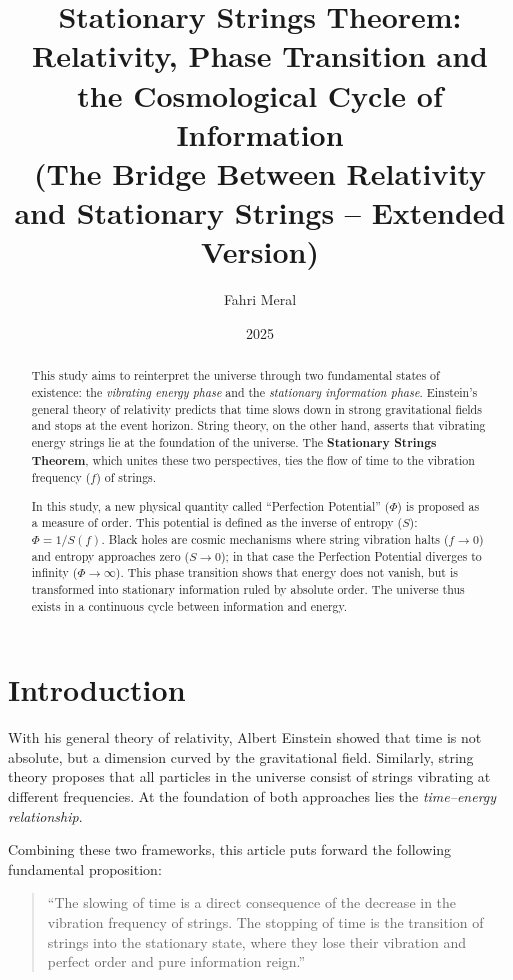 \documentclass[12pt,a4paper]{article}
\title{\textbf{Stationary Strings Theorem: Relativity, Phase Transition and the Cosmological Cycle of Information}\\
\large (The Bridge Between Relativity and Stationary Strings -- Extended Version)}
\author{Fahri Meral}
\date{2025}
\begin{document}
\maketitle

\begin{abstract}
This study aims to reinterpret the universe through two fundamental states of existence: the \textit{vibrating energy phase} and the \textit{stationary information phase}.
Einstein's general theory of relativity predicts that time slows down in strong gravitational fields and stops at the event horizon.
String theory, on the other hand, asserts that vibrating energy strings lie at the foundation of the universe.
The \textbf{Stationary Strings Theorem}, which unites these two perspectives, ties the flow of time to the vibration frequency ($f$) of strings.

In this study, a new physical quantity called ``Perfection Potential'' ($\Phi$) is proposed as a measure of order. This potential is defined as the inverse of entropy ($S$): $\Phi = 1/S(f)$. Black holes are cosmic mechanisms where string vibration halts ($f \to 0$) and entropy approaches zero ($S \to 0$); in that case the Perfection Potential diverges to infinity ($\Phi \to \infty$). This phase transition shows that energy does not vanish, but is transformed into stationary information ruled by absolute order. The universe thus exists in a continuous cycle between information and energy.
\end{abstract}

\section{Introduction}
With his general theory of relativity, Albert Einstein showed that time is not absolute, but a dimension curved by the gravitational field.
Similarly, string theory proposes that all particles in the universe consist of strings vibrating at different frequencies.
At the foundation of both approaches lies the \textit{time--energy relationship}.

Combining these two frameworks, this article puts forward the following fundamental proposition:
\begin{quote}
``The slowing of time is a direct consequence of the decrease in the vibration frequency of strings.
The stopping of time is the transition of strings into the stationary state, where they lose their vibration and perfect order and pure information reign.''
\end{quote}
\end{document}
